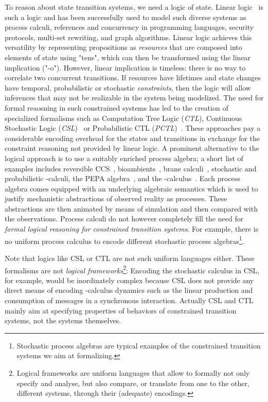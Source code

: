 \documentclass{article}
\newcommand\proofsystem[1]{{\smaller\rmfamily\slshape #1}\xspace}
\begin{document}
To reason about state transition systems, we need a logic of state. 
Linear logic~\cite{girard87tcs} is such a logic and has been successfully used
to model such diverse systems as 
process calculi, references and concurrency in programming languages, 
security protocols, multi-set rewriting, and graph algorithms.
Linear logic achieves this versatility by representing propositions as \emph{resources}
that are composed into elements of state using "tens", which can then be
transformed using the linear implication ("-o").  However, linear implication is
timeless: there is no way to correlate two concurrent transitions.
If resources have lifetimes and state changes have temporal, probabilistic or
stochastic \emph{constraints}, then the logic will allow inferences that may not
be realizable in the system being modelized. 
The need for formal reaosning in such constrained systems has led to the
creation of specialized formalisms such as Computation Tree Logic
(\proofsystem{CTL})\cite{Emerson95}, Continuous Stochastic Logic
(\proofsystem{CSL})~\cite{aziz00tcl} or Probabilistic CTL
(\proofsystem{PCTL})~\cite{hansson94fac}.
These approaches pay a considerable encoding overhead for the states and
transitions in exchange for the constraint reasoning not provided by linear logic.
A prominent alternative to the logical approach is to use a suitably enriched
process algebra; a short list of examples includes 
reversible CCS~\cite{danos03bc}, bioambients~\cite{regev04tcs}, 
brane calculi~\cite{cardelli03bc}, stochastic and probabilistic -calculi, 
the PEPA algebra~\cite{hillston96book}, and the -calculus~\cite{danos04tcs}.
Each process algebra comes equipped with an underlying algebraic semantics which
is used to justify mechanistic abstractions of observed reality as processes. 
These abstractions are then animated by means of simulation and then
compared with the observations. 
Process calculi do not however completely fill the need for
{\em formal logical reasoning for constrained transition systems}. 
For example, there is no uniform process calculus to encode 
different stochastic process algebras\footnote{Stochastic process algebras are 
typical examples of the constrained transition systems we aim at formalizing.}. 

Note that logics like CSL or CTL are not such uniform languages either. These formalisms
are not \emph{logical frameworks}\footnote
{
Logical frameworks are uniform languages that allow to formally not only specify and analyse,
but also compare, or translate from one to the other, different systems, through their 
(adequate) encodings.
}: 
Encoding the stochastic  calculus in CSL, for example, would be
inordinately complex because CSL does not provide any direct means of encoding
-calculus dynamics such as the linear production and consumption of
messages in a synchronous interaction.
Actually CSL and CTL mainly aim at specifying properties of behaviors of constrained 
transition systems, not the systems themselves.
\end{document}
